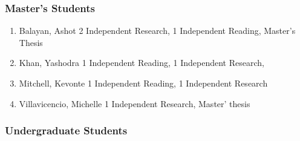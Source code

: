 \documentclass[11pt,a4paper,]{moderncv}
\providecommand{\tightlist}{%
	\setlength{\itemsep}{0pt}\setlength{\parskip}{0pt}}
\begin{document}
\hypertarget{masters-students}{%
\subsubsection{Master's Students}\label{masters-students}}

\begin{enumerate}
\def\labelenumi{\arabic{enumi}.}
\tightlist
\item
  Balayan, Ashot 2 Independent Research, 1 Independent Reading, Master's Thesis
\item
  Khan, Yashodra 1 Independent Reading, 1 Independent Research,
\item
  Mitchell, Kevonte 1 Independent Reading, 1 Independent Research
\item
  Villavicencio, Michelle 1 Independent Research, Master' thesis
\end{enumerate}

\hypertarget{undergraduate-students}{%
\subsubsection{Undergraduate Students}\label{undergraduate-students}}
\end{document}
